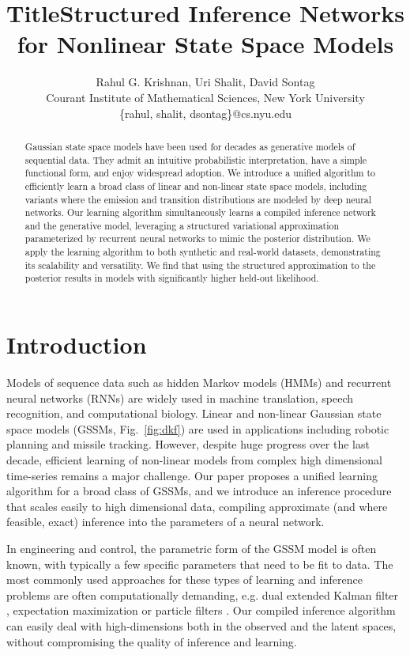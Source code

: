 \documentclass[letterpaper]{article}
\title{Title}
\author{Rahul G. Krishnan, Uri Shalit, David Sontag\\
	Courant Institute of Mathematical Sciences, 
	New York University\\
	\{rahul, shalit, dsontag\}@cs.nyu.edu\\
}
\theoremstyle{plain}
\begin{document}
\title{Structured Inference Networks for Nonlinear State Space Models} 
\maketitle
\begin{abstract}
Gaussian state space models have been used for decades as generative models of sequential data. They admit an intuitive probabilistic interpretation, have a simple functional form, and enjoy widespread adoption. We introduce a unified algorithm to efficiently learn a broad class of linear and non-linear state space models, including variants where the emission and transition distributions are modeled by deep neural networks. Our learning algorithm simultaneously learns a compiled inference network and the generative model, leveraging a structured variational approximation parameterized by recurrent neural networks to mimic the posterior distribution. We apply the learning algorithm to both synthetic and real-world datasets, demonstrating its scalability and versatility. We find that using the structured approximation to the posterior results in models with significantly higher held-out likelihood.
 \end{abstract}

\section{Introduction}

Models of sequence data such as hidden Markov models (HMMs) and
recurrent neural networks (RNNs)
are widely used in machine translation, 
speech recognition, 
and computational biology.
Linear and non-linear
Gaussian state space models (GSSMs, Fig.~\ref{fig:dkf}) are used in applications including
robotic planning and missile
tracking. 
However, despite huge progress over the last decade, efficient learning of
non-linear models from
complex high dimensional time-series remains a major challenge.
Our paper proposes a unified learning algorithm for a broad class of
GSSMs, and we introduce an inference procedure that scales easily to high dimensional data, 
compiling approximate (and where feasible, exact)
inference into the parameters of a neural network.  

In engineering and control, the parametric form of the GSSM model is often known, with typically a few
specific parameters that need to be fit to data. The most commonly used approaches for these types of learning and inference problems are often computationally demanding, e.g. dual extended Kalman filter \cite{Wan_NIPS96}, expectation maximization \cite{Briegel99fisherscoring,roweis2000algorithm}
or particle filters \cite{schon2011system}. Our compiled inference algorithm can easily deal with high-dimensions both in the observed and the latent spaces, without compromising the quality of inference and learning.
\end{document}
